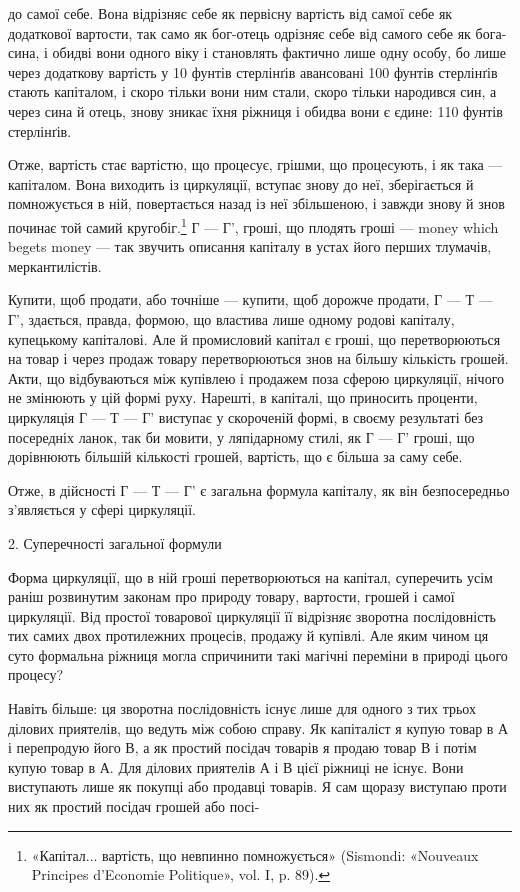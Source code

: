 \parcont{}  %
до самої себе. Вона відрізняє себе як первісну вартість від самої
себе як додаткової вартости, так само як бог-отець одрізняє
себе від самого себе як бога-сина, і обидві вони одного віку
і становлять фактично лише одну особу, бо лише через додаткову
вартість у 10 фунтів стерлінґів авансовані 100 фунтів стерлінґів
стають капіталом, і скоро тільки вони ним стали, скоро тільки
народився син, а через сина й отець, знову зникає їхня ріжниця
і обидва вони є єдине: 110 фунтів стерлінґів.

Отже, вартість стає вартістю, що процесує, грішми, що процесують,
і як така — капіталом. Вона виходить із циркуляції,
вступає знову до неї, зберігається й помножується в ній, повертається
назад із неї збільшеною, і завжди знову й знов починає той
самий кругобіг.\footnote{
«Капітал... вартість, що невпинно помножується» (Sismondi: «Nouveaux
Principes d’Economie Politique», vol. I, p. 89).
} Г — Г', гроші, що плодять гроші — money which
begets money — так звучить описання капіталу в устах його
перших тлумачів, меркантилістів.

Купити, щоб продати, або точніше — купити, щоб дорожче
продати, Г — Т — Г', здається, правда, формою, що властива
лише одному родові капіталу, купецькому капіталові. Але й
промисловий капітал є гроші, що перетворюються на товар і
через продаж товару перетворюються знов на більшу кількість
грошей. Акти, що відбуваються між купівлею і продажем поза
сферою циркуляції, нічого не змінюють у цій формі руху. Нарешті,
в капіталі, що приносить проценти, циркуляція Г — Т — Г'
виступає у скороченій формі, в своєму результаті без посередніх
ланок, так би мовити, у ляпідарному стилі, як Г — Г' гроші, що
дорівнюють більшій кількості грошей, вартість, що є більша за
саму себе.

Отже, в дійсності Г — Т — Г' є загальна формула капіталу,
як він безпосередньо з’являється у сфері циркуляції.

2. Суперечності загальної формули

Форма циркуляції, що в ній гроші перетворюються на капітал,
суперечить усім раніш розвинутим законам про природу товару,
вартости, грошей і самої циркуляції. Від простої товарової
циркуляції її відрізняє зворотна послідовність тих самих двох
протилежних процесів, продажу й купівлі. Але яким чином
ця суто формальна ріжниця могла спричинити такі магічні переміни
в природі цього процесу?

Навіть більше: ця зворотна послідовність існує лише для
одного з тих трьох ділових приятелів, що ведуть між собою
справу. Як капіталіст я купую товар в А і перепродую його В,
а як простий посідач товарів я продаю товар В і потім купую
товар в А. Для ділових приятелів А і В цієї ріжниці не існує.
Вони виступають лише як покупці або продавці товарів. Я сам
щоразу виступаю проти них як простий посідач грошей або посі-
\parbreak{}  %
